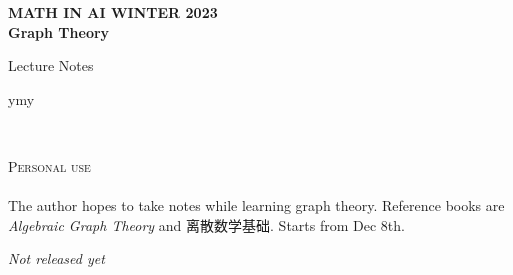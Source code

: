 \documentclass[11pt,fleqn]{book} %
\begin{document}
\begin{CJK}{UTF8}{gkai} %

\begingroup
\thispagestyle{empty}
\centering
\vspace*{5cm}
\par\normalfont\fontsize{35}{35}\sffamily\selectfont
\textbf{MATH IN AI WINTER 2023}\\
\vspace*{0.4cm}
{\Huge \textbf{Graph Theory}}\par %
\vspace*{0.4cm}
{\Huge Lecture Notes}\par %
{\Large ymy}\par
\endgroup


\newpage
~\vfill
\thispagestyle{empty}


\noindent \textsc{Personal use}\\

\\ %

\noindent The author hopes to take notes while learning graph theory. Reference books are \textit{Algebraic Graph Theory} and 离散数学基础. Starts from Dec 8th. 

\noindent \textit{Not released yet} %



\pagestyle{empty} %

\tableofcontents %


\end{CJK}
\end{document}
